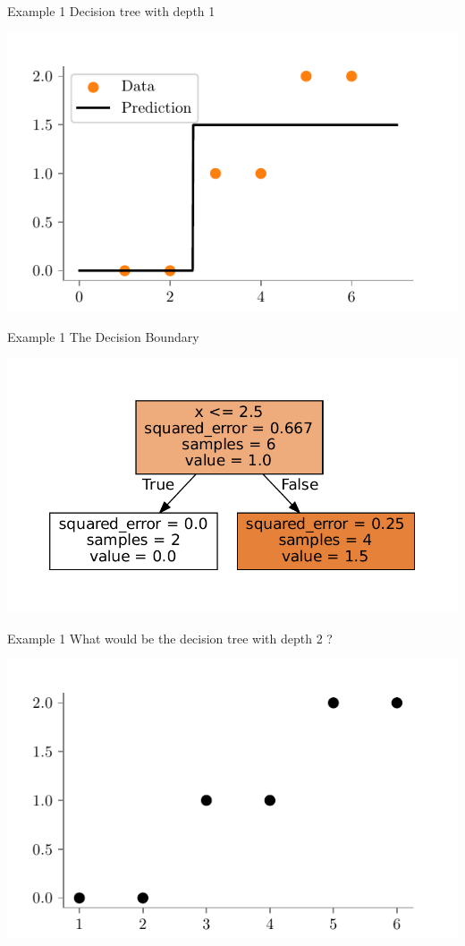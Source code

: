 \documentclass{beamer}
\begin{document}
\begin{frame}{Example 1}
Decision tree with depth 1
\begin{center}
\includegraphics{../figures/decision-trees/ri-ro-depth-1.pdf}	
\end{center}
\end{frame}

\begin{frame}{Example 1}
The Decision Boundary
\begin{center}
\includegraphics{../figures/decision-trees/ri-ro-depth-1-sklearn.pdf}
\end{center}
\end{frame}


\begin{frame}{Example 1}
What would be the decision tree with depth 2	?
\begin{center}
	\includegraphics{../figures/decision-trees/ri-ro-dataset.pdf}
\end{center}
\end{frame}
\end{document}
